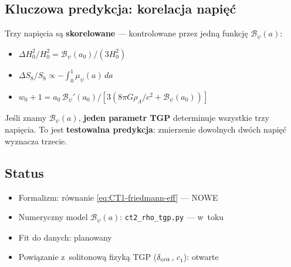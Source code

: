 \subsection{Kluczowa predykcja: korelacja napi\k{e}\'c}

Trzy napi\k{e}cia s\k{a} \textbf{skorelowane} --- kontrolowane
przez jedn\k{a} funkcj\k{e} $\mathcal{B}_\psi(a)$:
\begin{itemize}
  \item $\Delta H_0^2 / H_0^2 = \mathcal{B}_\psi(a_0) / (3H_0^2)$
  \item $\Delta S_8 / S_8 \propto -\int_0^1 \mu_\psi(a)\,da$
  \item $w_0 + 1 = a_0\,\mathcal{B}_\psi'(a_0) / [3(8\pi G\rho_\Lambda/c^2 + \mathcal{B}_\psi(a_0))]$
\end{itemize}

Je\'sli znamy $\mathcal{B}_\psi(a)$, \textbf{jeden parametr TGP}
determinuje wszystkie trzy napi\k{e}cia. To jest \textbf{testowalna predykcja}:
zmierzenie dowolnych dw\'och napi\k{e}\'c wyznacza trzecie.

\subsection{Status}

\begin{itemize}
  \item Formalizm: r\'ownanie \eqref{eq:CT1-friedmann-eff} --- NOWE
  \item Numeryczny model $\mathcal{B}_\psi(a)$: \texttt{ct2\_rho\_tgp.py} --- w~toku
  \item Fit do danych: planowany
  \item Powi\k{a}zanie z~solitonow\k{a} fizyk\k{a} TGP ($\delta_{\rm crit}$, $c_1$): otwarte
\end{itemize}



